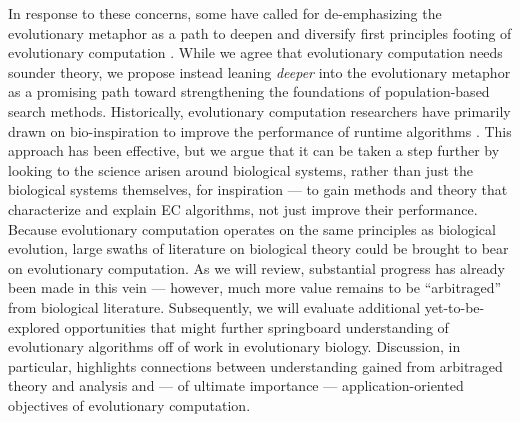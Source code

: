 In response to these concerns, some have called for de-emphasizing the evolutionary metaphor as a path to deepen and diversify first principles footing of evolutionary computation \citep{moore2023evolution}.
While we agree that evolutionary computation needs sounder theory, we propose instead leaning \textit{deeper} into the evolutionary metaphor as a promising path toward strengthening the foundations of population-based search methods.
Historically, evolutionary computation researchers have primarily drawn on bio-inspiration to improve the performance of runtime algorithms \citep{banzhaf2006artificial,kumar2003biologically,mcphee2009developmental}.
This approach has been effective, but we argue that it can be taken a step further by looking to the science arisen around biological systems, rather than just the biological systems themselves, for inspiration --- to gain methods and theory that characterize and explain EC algorithms, not just improve their performance.
Because evolutionary computation operates on the same principles as biological evolution, large swaths of literature on biological theory could be brought to bear on evolutionary computation.
As we will review, substantial progress has already been made in this vein --- however, much more value remains to be ``arbitraged'' from biological literature.
Subsequently, we will evaluate additional yet-to-be-explored opportunities that might further springboard understanding of evolutionary algorithms off of work in evolutionary biology.
Discussion, in particular, highlights connections between understanding gained from arbitraged theory and analysis and --- of ultimate importance --- application-oriented objectives of evolutionary computation.


